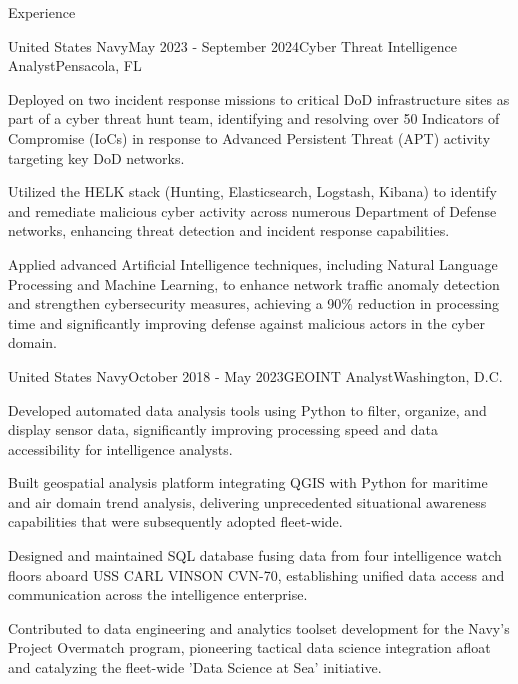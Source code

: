 \documentclass[
	11pt, %
]{resume} %
\begin{document}
\begin{rSection}{Experience}
	\begin{rSubsection}{United States Navy}{May 2023 - September 2024}{Cyber Threat Intelligence Analyst}{Pensacola, FL}
        \item Deployed on two incident response missions to critical DoD infrastructure sites as part of a cyber threat hunt team, identifying and resolving over 50 Indicators of Compromise (IoCs) in response to Advanced Persistent Threat (APT) activity targeting key DoD networks.
		\item Utilized the HELK stack (Hunting, Elasticsearch, Logstash, Kibana) to identify and remediate malicious cyber activity across numerous Department of Defense networks, enhancing threat detection and incident response capabilities.
	    \item Applied advanced Artificial Intelligence techniques, including Natural Language Processing and Machine Learning, to enhance network traffic anomaly detection and strengthen cybersecurity measures, achieving a 90\% reduction in processing time and significantly improving defense against malicious actors in the cyber domain.

	\end{rSubsection}
	\begin{rSubsection}{United States Navy}{October 2018 - May 2023}{GEOINT Analyst}{Washington, D.C.}
		\item Developed automated data analysis tools using Python to filter, organize, and display sensor data, significantly improving processing speed and data accessibility for intelligence analysts.
		\item Built geospatial analysis platform integrating QGIS with Python for maritime and air domain trend analysis, delivering unprecedented situational awareness capabilities that were subsequently adopted fleet-wide.
		\item Designed and maintained SQL database fusing data from four intelligence watch floors aboard USS CARL VINSON CVN-70, establishing unified data access and communication across the intelligence enterprise.
		\item Contributed to data engineering and analytics toolset development for the Navy's Project Overmatch program, pioneering tactical data science integration afloat and catalyzing the fleet-wide 'Data Science at Sea' initiative.
	\end{rSubsection}



\end{rSection}
\end{document}
